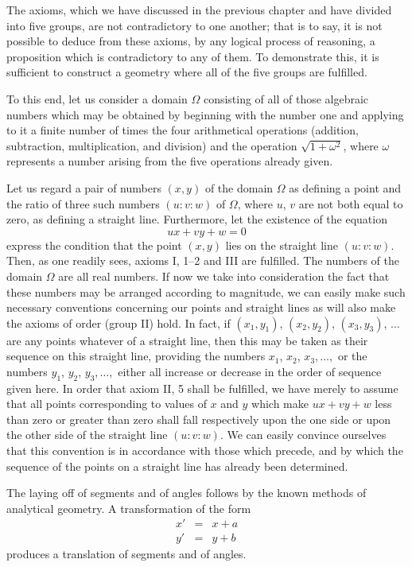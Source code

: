 \documentclass[11pt,oneside]{book}
\begin{document}
The axioms, which we have discussed in the previous
chapter and have divided into five groups,
are not contradictory to one another; that is to say,
it is not possible to deduce from these axioms, by any
logical process of reasoning, a proposition which is
contradictory to any of them. To demonstrate this,
it is sufficient to construct a geometry where all of the
five groups are fulfilled.

To this end, let us consider a domain $\Omega$ consisting
of all of those algebraic numbers which may be obtained
by beginning with the number one and applying
to it a finite number of times the four arithmetical
operations (addition, subtraction, multiplication,
and division) and the operation $\sqrt{1+\omega^2}$, where $\omega$ represents
a number arising from the five operations already
given.

Let us regard a pair of numbers $(x, y)$ of the domain
$\Omega$ as defining a point and the ratio of three such
numbers $(u:v:w)$ of $\Omega$, where $u$, $v$ are not both equal
to zero, as defining a straight line. Furthermore, let
the existence of the equation
\[
ux+vy+w = 0
\]
express the condition that the point $(x, y)$ lies on the
\label{folio30}
straight line $(u:v:w)$. Then, as one readily sees,
axioms I, 1--2 and III are fulfilled. The numbers of
the domain $\Omega$ are all real numbers. If now we take
into consideration the fact that these numbers may be
arranged according to magnitude, we can easily make
such necessary conventions concerning our points and
straight lines as will also make the axioms of order
(group II) hold. In fact, if $(x_1,y_1)$, $(x_2, y_2)$, $(x_3, y_3)$,
$\ldots$ are any points whatever of a straight line, then
this may be taken as their sequence on this straight
line, providing the numbers $x_1$, $x_2$, $x_3,\ldots,$ or the
numbers $y_1$, $y_2$, $y_3, \ldots,$ either all increase or decrease
in the order of sequence given here. In order that
axiom II, 5 shall be fulfilled, we have merely to assume
that all points corresponding to values of $x$ and
$y$ which make $ux+vy+w$ less than zero or greater
than zero shall fall respectively upon the one side or
upon the other side of the straight line $(u:v:w)$.
We can easily convince ourselves that this convention
is in accordance with those which precede, and
by which the sequence of the points on a straight line
has already been determined.

The laying off of segments and of angles follows
by the known methods of analytical geometry. A
transformation of the form
\begin{eqnarray*}
x' & = & x + a \\
y' & = & y + b
\end{eqnarray*}
produces a translation of segments and of angles.
\end{document}
